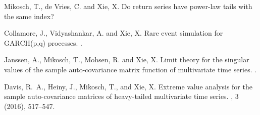 \begin{enumerate}



{\sc Mikosch, T., de Vries, C. and Xie, X.}
\newblock Do return series have power-law tails with the same index?

{\sc Collamore, J., Vidyashankar, A. and Xie, X.}
\newblock Rare event simulation for GARCH(p,q) processes.
.

{\sc Janssen, A., Mikosch, T., Mohsen, R. and Xie, X.}
\newblock Limit theory for the singular values of the sample auto-covariance
  matrix function of multivariate time series.
.

{\sc Davis, R.~A., Heiny, J., Mikosch, T., and Xie, X.}
\newblock Extreme value analysis for the sample auto-covariance matrices of
  heavy-tailed multivariate time series.
, 3 (2016), 517--547. \href{http://link.springer.com/article/10.1007/s10687-016-0251-7}{\blue{[pdf]}}
\end{enumerate}


\newpage
\tableofcontents

\mainmatter

\def\phdthesis{1}






% 


\newpage
\leavevmode\thispagestyle{empty}
\phantom{bla}









